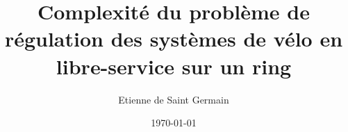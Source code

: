 \documentclass[twoside,11pt,openany,a4paper]{rapport}
\begin{document}
\title{Complexité du problème de régulation des systèmes de vélo en libre-service sur un ring}
\author{Etienne de Saint Germain}
\date{\today}



\cleardoublepage







\tableofcontents
{}
\listoffigures
{}



\cleardoublepage
















\backmatter


\end{document}
